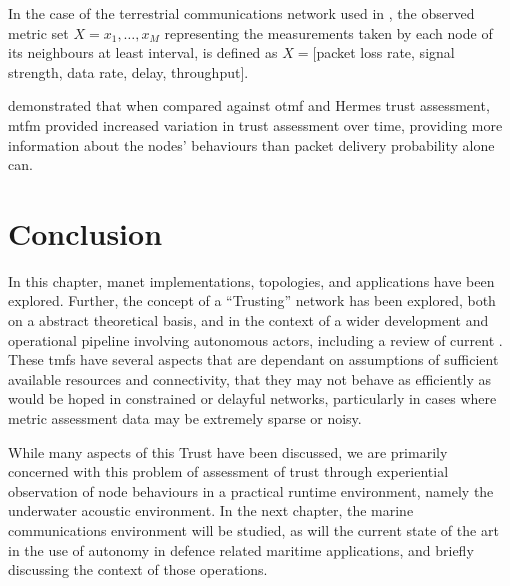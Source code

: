 In the case of the terrestrial communications network used in \cite{Guo11}, the observed metric set $X = {x_1,\dots,x_M}$ representing the measurements taken by each node of its neighbours at least interval, is defined as $X=[$packet loss rate, signal strength, data rate, delay, throughput$]$.

\citet{Guo11} demonstrated that when compared against \gls{otmf} and Hermes trust assessment, \gls{mtfm} provided increased variation in trust assessment over time, providing more information about the nodes' behaviours than packet delivery probability alone can.

\section{Conclusion}
In this chapter, \gls{manet} implementations, topologies, and applications have been explored. 
Further, the concept of a ``Trusting'' network has been explored, both on a abstract theoretical basis, and in the context of a wider development and operational pipeline involving autonomous actors, including a review of current .
These \glspl{tmf} have several aspects that are dependant on assumptions of sufficient available resources and connectivity, that they may not behave as efficiently as would be hoped in constrained or delayful networks, particularly in cases where metric assessment data may be extremely sparse or noisy.

While many aspects of this Trust have been discussed, we are primarily concerned with this problem of assessment of trust through experiential observation of node behaviours in a practical runtime environment, namely the underwater acoustic environment.
In the next chapter, the marine communications environment will be studied, as will the current state of the art in the use of autonomy in defence related maritime applications, and briefly discussing the context of those operations.

